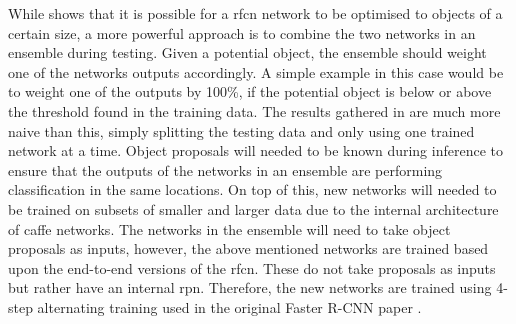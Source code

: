 While  shows that it is possible for a \gls{rfcn} network to be optimised to objects of a certain size, a more powerful approach is to combine the two networks in an ensemble during testing. Given a potential object, the ensemble should weight one of the networks outputs accordingly. A simple example in this case would be to weight one of the outputs by 100\%, if the potential object is below or above the threshold found in the training data. The results gathered in  are much more naive than this, simply splitting the testing data and only using one trained network at a time. Object proposals will needed to be known during inference to ensure that the outputs of the networks in an ensemble are performing classification in the same locations. On top of this, new networks will needed to be trained on subsets of smaller and larger data due to the internal architecture of \gls{caffe} networks. The networks in the ensemble will need to take object proposals as inputs, however, the above mentioned networks are trained based upon the end-to-end versions of the \gls{rfcn}. These do not take proposals as inputs but rather have an internal \gls{rpn}. Therefore, the new networks are trained using 4-step alternating training used in the original Faster R-CNN paper \cite{fasterrcnn}. 

